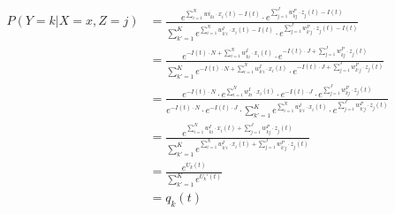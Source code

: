 \begin{equation}
\begin{split}
P(Y=k|X=x,Z=j) &= \frac{e^{\sum_{i=1}^N w{i}_{ki} \cdot x_i(t) - I(t)} \cdot e^{\sum_{j=1}^J w^{P}_{kj} \cdot z_j(t) - I(t)}}{\sum_{k'=1}^K  e^{\sum_{i=1}^N w^{I}_{k'i} \cdot x_i(t) - I(t)} \cdot e^{\sum_{j=1}^J w^{P}_{k'j} \cdot z_j(t) - I(t)}}\\
&= \frac{e^{-I(t) \cdot N + \sum_{i=1}^N w^{I}_{ki} \cdot x_i(t)} \cdot e^{-I(t) \cdot J + \sum_{j=1}^J w^{P}_{kj} \cdot z_j(t)}}{\sum_{k'=1}^K  e^{-I(t) \cdot N + \sum_{i=1}^N w^{I}_{k'i} \cdot x_i(t)} \cdot e^{-I(t) \cdot J + \sum_{j=1}^J w^{P}_{k'j} \cdot z_j(t)}}\\
&= \frac{e^{-I(t) \cdot N} \cdot e^{\sum_{i=1}^N w^{I}_{ki} \cdot x_i(t)} \cdot e^{-I(t) \cdot J} \cdot e^{\sum_{j=1}^J w^{P}_{kj} \cdot z_j(t)}}{e^{-I(t) \cdot N} \cdot e^{-I(t) \cdot J} \cdot \sum_{k'=1}^K  e^{\sum_{i=1}^N w^{I}_{k'i} \cdot x_i(t)} \cdot e^{\sum_{j=1}^J w^{P}_{k'j} \cdot z_j(t)}}\\
&= \frac{e^{\sum_{i=1}^N w^{I}_{ki} \cdot x_i(t) + \sum_{j=1}^J w^{P}_{kj} \cdot z_j(t)}}{\sum_{k'=1}^K  e^{\sum_{i=1}^N w^{I}_{k'i} \cdot x_i(t) + \sum_{j=1}^J w^{P}_{k'j} \cdot z_j(t)}}\\
&= \frac{e^{U_k(t)}}{\sum_{k'=1}^K e^{U_k'(t)}}\\
&= q_k(t)
\end{split}
\end{equation}


